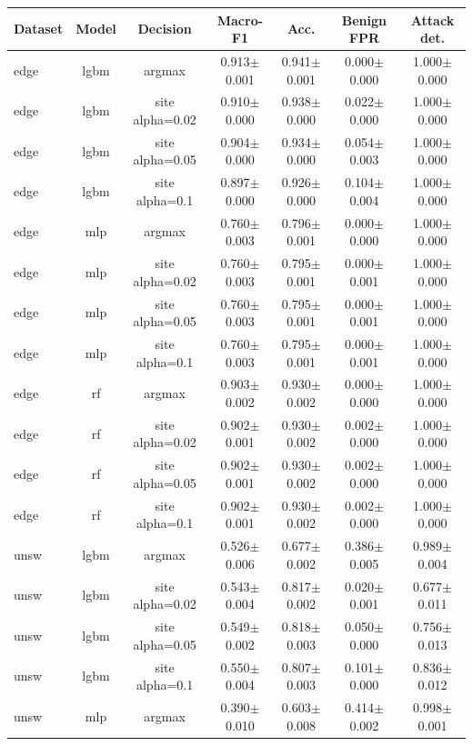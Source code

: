\begin{tabular}{lcccccc}
\toprule
Dataset & Model & Decision & Macro-F1 & Acc. & Benign FPR & Attack det. \\
\midrule
edge & lgbm & argmax & 0.913$\pm$0.001 & 0.941$\pm$0.001 & 0.000$\pm$0.000 & 1.000$\pm$0.000 \\
edge & lgbm & site alpha=0.02 & 0.910$\pm$0.000 & 0.938$\pm$0.000 & 0.022$\pm$0.000 & 1.000$\pm$0.000 \\
edge & lgbm & site alpha=0.05 & 0.904$\pm$0.000 & 0.934$\pm$0.000 & 0.054$\pm$0.003 & 1.000$\pm$0.000 \\
edge & lgbm & site alpha=0.1 & 0.897$\pm$0.000 & 0.926$\pm$0.000 & 0.104$\pm$0.004 & 1.000$\pm$0.000 \\
edge & mlp & argmax & 0.760$\pm$0.003 & 0.796$\pm$0.001 & 0.000$\pm$0.000 & 1.000$\pm$0.000 \\
edge & mlp & site alpha=0.02 & 0.760$\pm$0.003 & 0.795$\pm$0.001 & 0.000$\pm$0.001 & 1.000$\pm$0.000 \\
edge & mlp & site alpha=0.05 & 0.760$\pm$0.003 & 0.795$\pm$0.001 & 0.000$\pm$0.001 & 1.000$\pm$0.000 \\
edge & mlp & site alpha=0.1 & 0.760$\pm$0.003 & 0.795$\pm$0.001 & 0.000$\pm$0.001 & 1.000$\pm$0.000 \\
edge & rf & argmax & 0.903$\pm$0.002 & 0.930$\pm$0.002 & 0.000$\pm$0.000 & 1.000$\pm$0.000 \\
edge & rf & site alpha=0.02 & 0.902$\pm$0.001 & 0.930$\pm$0.002 & 0.002$\pm$0.000 & 1.000$\pm$0.000 \\
edge & rf & site alpha=0.05 & 0.902$\pm$0.001 & 0.930$\pm$0.002 & 0.002$\pm$0.000 & 1.000$\pm$0.000 \\
edge & rf & site alpha=0.1 & 0.902$\pm$0.001 & 0.930$\pm$0.002 & 0.002$\pm$0.000 & 1.000$\pm$0.000 \\
unsw & lgbm & argmax & 0.526$\pm$0.006 & 0.677$\pm$0.002 & 0.386$\pm$0.005 & 0.989$\pm$0.004 \\
unsw & lgbm & site alpha=0.02 & 0.543$\pm$0.004 & 0.817$\pm$0.002 & 0.020$\pm$0.001 & 0.677$\pm$0.011 \\
unsw & lgbm & site alpha=0.05 & 0.549$\pm$0.002 & 0.818$\pm$0.003 & 0.050$\pm$0.000 & 0.756$\pm$0.013 \\
unsw & lgbm & site alpha=0.1 & 0.550$\pm$0.004 & 0.807$\pm$0.003 & 0.101$\pm$0.000 & 0.836$\pm$0.012 \\
unsw & mlp & argmax & 0.390$\pm$0.010 & 0.603$\pm$0.008 & 0.414$\pm$0.002 & 0.998$\pm$0.001 \\

\end{tabular}
